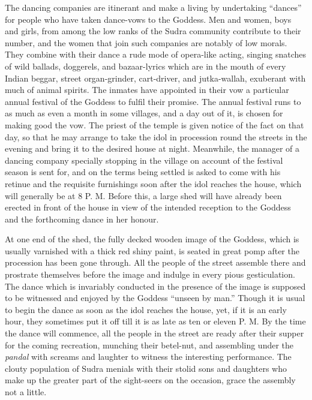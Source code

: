 \documentclass[a4paper, 12pt, oneside, english]{article}
\begin{document}
The dancing companies are itinerant and make a living by undertaking ``dances'' for people who have taken dance-vows to the Goddess. Men and women, boys and girls, from among the low ranks of the Sudra community contribute to their number, and the women that join such companies are notably of low morals. They combine with their dance a rude mode of opera-like acting, singing snatches of wild ballads, doggerels, and bazaar-lyrics which are in the mouth of every Indian beggar, street organ-grinder, cart-driver, and jutka-wallah, exuberant with much of animal spirits. The inmates have appointed in their vow a particular annual festival of the Goddess to fulfil their promise. The annual festival runs to as much as even a month in some villages, and a day out of it, is chosen for making good the vow. The priest of the temple is given notice of the fact on that day, so that he may arrange to take the idol in procession round the streets in the evening and bring it to the desired house at night. Meanwhile, the manager of a dancing company specially stopping in the village on account of the festival season is sent for, and on the terms being settled is asked to come with his retinue and the requisite furnishings soon after the idol reaches the house, which will generally be at 8 P. M. Before this, a large shed will have already been erected in front of the house in view of the intended reception to the Goddess and the forthcoming dance in her honour.

At one end of the shed, the fully decked wooden image of the Goddess, which is usually varnished with a thick red shiny paint, is seated in great pomp after the procession has been gone through. All the people of the street assemble there and prostrate themselves before the image and indulge in every pious gesticulation. The dance which is invariably conducted in the presence of the image is supposed to be witnessed and enjoyed by the Goddess ``unseen by man.'' Though it is usual to begin the dance as soon as the idol reaches the house, yet, if it is an early hour, they sometimes put it off till it is as late as ten or eleven P. M. By the time the dance will commence, all the people in the street are ready after their supper for the coming recreation, munching their betel-nut, and assembling under the \emph{pandal} with screams and laughter to witness the interesting performance. The clouty population of Sudra menials with their stolid sons and daughters who make up the greater part of the sight-seers on the occasion, grace the assembly not a little.
\end{document}

